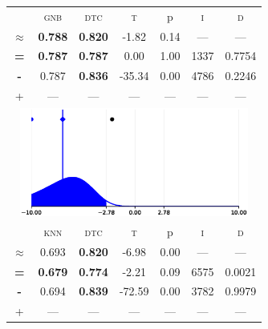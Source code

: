 \begin{tabular}{c||cc||c|c|c||c}
\midrule	&\textsc{gnb} & \textsc{dtc} & \textsc{t} & p & \textsc{i} & \textsc{d}\\
	\color{black} $\approx$ & \color{black} \bfseries 0.788 &\color{black}  \bfseries 0.820 & -1.82 & 0.14 & --- & ---\\\midrule
	{\bfseries\color{black}\tiny=}& \color{black} \bfseries 0.787 & \color{black} \bfseries 0.787 & 0.00 & 1.00 & 1337 & \color{black} 0.7754\\
	{\bfseries\color{blue}\tiny-}& \color{blue}  0.787 & \color{blue} \bfseries 0.836 & -35.34 & 0.00 & 4786 & \color{blue} 0.2246\\
	{\tiny+}& --- & --- & --- & --- & --- & ---\\
	\bottomrule
	\multicolumn{7}{c}{\includegraphics[width=7.5cm, trim=30 0 30 0]{figures/australian_2.eps}}\\

\midrule	&\textsc{knn} & \textsc{dtc} & \textsc{t} & p & \textsc{i} & \textsc{d}\\
	\color{blue} $\approx$ & \color{blue}  0.693 &\color{blue}  \bfseries 0.820 & -6.98 & 0.00 & --- & ---\\\midrule
	{\bfseries\color{black}\tiny=}& \color{black} \bfseries 0.679 & \color{black} \bfseries 0.774 & -2.21 & 0.09 & 6575 & \color{black} 0.0021\\
	{\bfseries\color{blue}\tiny-}& \color{blue}  0.694 & \color{blue} \bfseries 0.839 & -72.59 & 0.00 & 3782 & \color{blue} 0.9979\\
	{\tiny+}& --- & --- & --- & --- & --- & ---\\
\bottomrule\end{tabular}


